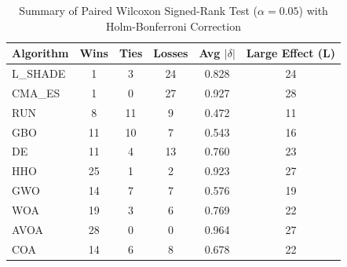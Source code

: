 \begin{table}[!t]
\centering\small
\caption{Summary of Paired Wilcoxon Signed-Rank Test ($\alpha=0.05$) with Holm-Bonferroni Correction}
\label{tab:summary_stats}
\begin{tabular}{l|c|c|c|c|c}
\hline
Algorithm & Wins & Ties & Losses & Avg $|\delta|$ & Large Effect (L) \\\hline\hline
L_SHADE & 1 & 3 & 24 & 0.828 & 24 \\\hline
CMA_ES & 1 & 0 & 27 & 0.927 & 28 \\\hline
RUN & 8 & 11 & 9 & 0.472 & 11 \\\hline
GBO & 11 & 10 & 7 & 0.543 & 16 \\\hline
DE & 11 & 4 & 13 & 0.760 & 23 \\\hline
HHO & 25 & 1 & 2 & 0.923 & 27 \\\hline
GWO & 14 & 7 & 7 & 0.576 & 19 \\\hline
WOA & 19 & 3 & 6 & 0.769 & 22 \\\hline
AVOA & 28 & 0 & 0 & 0.964 & 27 \\\hline
COA & 14 & 6 & 8 & 0.678 & 22 \\\hline
\end{tabular}
\end{table}
